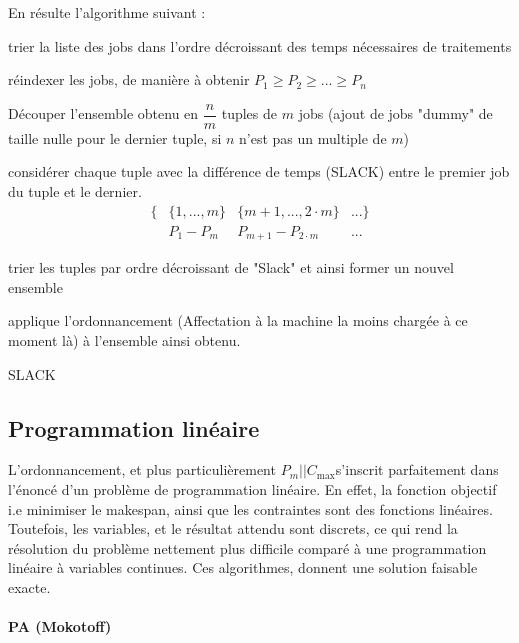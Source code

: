 \documentclass[a4paper,12pt]{report}
\theoremstyle{plain}				%
\theoremstyle{definition}				%
\newcommand\problemGraham{$P_m||C_{\max}$}
\begin{document}
En résulte l'algorithme suivant :

\bigskip
\begin{algorithm}[H]
\DontPrintSemicolon

trier la liste des jobs dans l'ordre décroissant des temps nécessaires de traitements

\BlankLine %
réindexer les jobs, de manière à obtenir $P_1 \geq P_2 \geq ... \geq P_n$

\BlankLine %
Découper l'ensemble obtenu en $\dfrac{n}{m}$ tuples de $m$ jobs (ajout de jobs "dummy" de taille nulle pour le dernier tuple, si $n$ n'est pas un multiple de $m$)

\BlankLine %
considérer chaque tuple avec la différence de temps (SLACK) entre le premier job du tuple et le dernier.
\begin{align*}
\{ &\{1, ..., m\} &\{m+1,..., 2 \cdot m\} &... \} \\
   &P_1 - P_m     &P_{m+1}-P_{2 \cdot m}  &...
\end{align*}


\BlankLine %
trier les tuples par ordre décroissant de "Slack" et ainsi former un nouvel ensemble

\BlankLine %
applique l'ordonnancement (Affectation à la machine la moins chargée à ce moment là) à l'ensemble ainsi obtenu.

\caption{SLACK\label{SLACK}}
\end{algorithm}

\subsection{Programmation linéaire}
L'ordonnancement, et plus particulièrement \problemGraham s'inscrit parfaitement dans l'énoncé d'un problème de programmation linéaire. En effet, la fonction objectif i.e minimiser le makespan, ainsi que les contraintes sont des fonctions linéaires. Toutefois, les variables, et le résultat attendu sont discrets, ce qui rend la résolution du problème nettement plus difficile comparé à une programmation linéaire à variables continues.
Ces algorithmes, donnent une solution faisable exacte.

\paragraph{PA (Mokotoff)}
\end{document}
